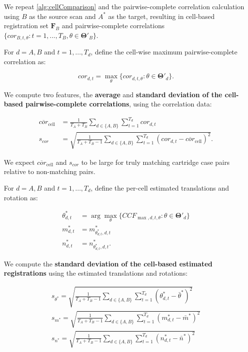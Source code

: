 \documentclass[preprint]{JASA}
\begin{document}
We repeat \autoref{alg:cellComparison} and the pairwise-complete
correlation calculation using \(B\) as the source scan and \(A^*\) as
the target, resulting in cell-based registration set \(\pmb{F}_B\) and
pairwise-complete correlations
\(\{cor_{B,t,\theta} : t = 1,...,T_B, \theta \in \pmb{\Theta}'_B\}\).

For \(d = A,B\) and \(t = 1,...,T_d\), define the cell-wise maximum
pairwise-complete correlation as:

\[
cor_{d,t} = \max_{\theta} \{cor_{d,t,\theta} : \theta \in \pmb{\Theta}'_d\}.
\]

We compute two features, the \textbf{average} and \textbf{standard
deviation of the cell-based pairwise-complete correlations}, using the
correlation data:

\begin{align*}
\overline{cor}_{\text{cell}} &= \frac{1}{T_A + T_B} \sum_{d \in \{A,B\}} \sum_{t=1}^{T_d} cor_{d,t} \\
s_{cor} &= \sqrt{\frac{1}{T_A + T_B - 1} \sum_{d \in \{A,B\}} \sum_{t=1}^{T_d} (cor_{d,t} - \overline{cor}_{\text{cell}})^2}.
\end{align*}

We expect \(\overline{cor}_{\text{cell}}\) and \(s_{cor}\) to be large
for truly matching cartridge case pairs relative to non-matching pairs.

For \(d = A,B\) and \(t = 1,...,T_d\), define the per-cell estimated
translations and rotation as:

\begin{align*}
\theta^*_{d,t} &= \arg \max_{\theta} \{CCF_{\max,d,t,\theta} : \theta \in \pmb{\Theta}'_d\} \\
m^*_{d,t} &= m^*_{\theta^*_{d,t},d,t} \\
n^*_{d,t} &= n^*_{\theta^*_{d,t},d,t}.
\end{align*}

We compute the \textbf{standard deviation of the cell-based estimated
registrations} using the estimated translations and rotations:

\begin{align*}
s_{\theta^*} =  \sqrt{\frac{1}{T_A + T_B - 1} \sum_{d \in \{A,B\}} \sum_{t=1}^{T_d} (\theta^*_{d,t} - \bar{\theta}^*)^2} \\
s_{m^*} =  \sqrt{\frac{1}{T_A + T_B - 1} \sum_{d \in \{A,B\}} \sum_{t=1}^{T_d} (m^*_{d,t} - \bar{m}^*)^2} \\
s_{n^*} = \sqrt{\frac{1}{T_A + T_B - 1} \sum_{d \in \{A,B\}} \sum_{t=1}^{T_d} (n^*_{d,t} - \bar{n}^*)^2}
\end{align*}
\end{document}
